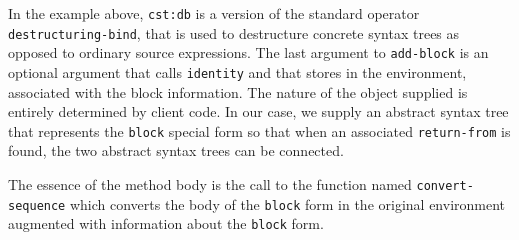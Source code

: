 \noindent
In the example above, \texttt{cst:db} is a version of the standard
\commonlisp{} operator \texttt{destructuring-bind}, that is used to
destructure concrete syntax trees as opposed to ordinary \commonlisp{}
source expressions.  The last argument to \texttt{add-block} is an
optional argument that \trucler{} calls \texttt{identity} and that
\trucler{} stores in the environment, associated with the block
information.  The nature of the object supplied is entirely determined
by client code.  In our case, we supply an abstract syntax tree that
represents the \texttt{block} special form so that when an associated
\texttt{return-from} is found, the two abstract syntax trees can be
connected.

The essence of the method body is the call to the function
named \texttt{convert-sequence} which converts the body of the
\texttt{block} form in the original environment augmented with
information about the \texttt{block} form.
